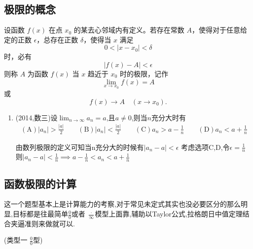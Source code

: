 \documentclass[12pt, a4paper, oneside, UTF8]{ctexbook}
\begin{document}
\subsection{极限的概念}
\begin{definition}[函数极限的定义]
    设函数 $f(x)$ 在点 $x_0$ 的某去心邻域内有定义。若存在常数 $A$，使得对于任意给定的正数 $\epsilon$，总存在正数 $\delta$，使得当 $x$ 满足
    \[
    0 < |x - x_0| < \delta
    \]
    时，必有
    \[
    |f(x) - A| < \epsilon
    \]
    则称 $A$ 为函数 $f(x)$ 当 $x$ 趋近于 $x_0$ 时的极限，记作
    \[
    \lim_{x \to x_0} f(x) = A
    \]
    或
    \[
    f(x) \to A \quad (x \to x_0).
    \]
\end{definition}
\begin{enumerate}[label=\arabic*.,start=3]
    \item  (2014,数三)设$\lim_{n\to\infty} a_n = a$,且$a \neq 0$,则当$n$充分大时有
    \begin{align*}
        (\text{A}) |a_n| > \frac{|a|}{2} \qquad
        (\text{B}) |a_n| < \frac{|a|}{2} \qquad
        (\text{C}) a_n > a - \frac{1}{n} \qquad
        (\text{D}) a_n < a + \frac{1}{n}
    \end{align*}
    
    \begin{solution}
    由数列极限的定义可知当n充分大的时候有$\left|a_n-a\right|<\epsilon$
    \newline 考虑选项C,D,令$\epsilon=\frac{1}{n}$
    则$\left|a_n-a\right|<\frac{1}{n} \implies a-\frac{1}{n}<a_n<a+\frac{1}{n}$
    \end{solution}
\end{enumerate}

\subsection{函数极限的计算}
这一个题型基本上是计算能力的考察,对于常见未定式其实也没必要区分的那么明显,目标都是往最简单$\frac{0}{0}$或者
$\frac{\cdot}{\infty}$模型上面靠,辅助以Taylor公式,拉格朗日中值定理结合夹逼准则来做就可以.
\begin{remark}(类型一 $\frac{0}{0}$型)
\end{remark}
\end{document}
